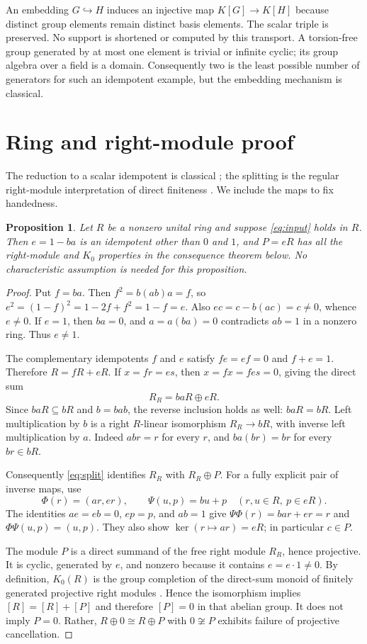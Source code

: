 \documentclass[11pt]{article}
\newtheorem{proposition}[theorem]{Proposition}
\begin{document}
An embedding $G\hookrightarrow H$ induces an injective map $K[G]\to K[H]$
because distinct group elements remain distinct basis elements. The
scalar triple is preserved. No support is shortened or computed by this
transport. A torsion-free group generated by at most one element is
trivial or infinite cyclic; its group algebra over a field is a domain.
Consequently two is the least possible number of generators for such
an idempotent example, but the embedding mechanism is classical.

\section{Ring and right-module proof}
The reduction to a scalar idempotent is classical
\cite[Proposition \texttt{kaplansky\_relations}]{Gardam}; the splitting
is the regular right-module interpretation of direct finiteness
\cite[p.~9]{Ara}. We include the maps to fix handedness.
\begin{proposition}\label{prop:ring}
Let $R$ be a nonzero unital ring and suppose \eqref{eq:input} holds in $R$.
Then $e=1-ba$ is an idempotent other than $0$ and $1$, and $P=eR$ has all
the right-module and $K_0$ properties in the consequence theorem below.
No characteristic assumption is needed for this proposition.
\end{proposition}
\begin{proof}
Put $f=ba$. Then $f^2=b(ab)a=f$, so
$e^2=(1-f)^2=1-2f+f^2=1-f=e$.
Also $ec=c-b(ac)=c\ne0$, whence $e\ne0$.
If $e=1$, then $ba=0$, and $a=a(ba)=0$ contradicts $ab=1$ in a
nonzero ring. Thus $e\ne1$.

The complementary idempotents $f$ and $e$ satisfy $fe=ef=0$ and
$f+e=1$. Therefore $R=fR+eR$. If $x=fr=es$, then
$x=fx=fes=0$, giving the direct sum
\begin{equation}\label{eq:split}
R_R=baR\oplus eR.
\end{equation}
Since $baR\subseteq bR$ and $b=bab$, the reverse inclusion holds as
well: $baR=bR$. Left multiplication by $b$ is a right $R$-linear
isomorphism $R_R\to bR$, with inverse left multiplication by $a$.
Indeed $abr=r$ for every $r$, and $ba(br)=br$ for every $br\in bR$.

Consequently \eqref{eq:split} identifies $R_R$ with $R_R\oplus P$.
For a fully explicit pair of inverse maps, use
\[
\Phi(r)=(ar,er),\qquad \Psi(u,p)=bu+p
\quad (r,u\in R,\ p\in eR).
\]
The identities $ae=eb=0$, $ep=p$, and $ab=1$ give
$\Psi\Phi(r)=bar+er=r$ and $\Phi\Psi(u,p)=(u,p)$.
They also show $\ker(r\mapsto ar)=eR$; in particular $c\in P$.

The module $P$ is a direct summand of the free right module $R_R$, hence
projective. It is cyclic, generated by $e$, and nonzero because it
contains $e=e\cdot1\ne0$. By definition, $K_0(R)$ is the group completion
of the direct-sum monoid of finitely generated projective right modules
\cite[Chapter II, Section 2]{Weibel}. Hence the isomorphism implies
$[R]=[R]+[P]$ and therefore $[P]=0$ in that abelian group.
It does not imply $P=0$. Rather, $R\oplus0\cong R\oplus P$ with
$0\not\cong P$ exhibits failure of projective cancellation.
\end{proof}
\end{document}
